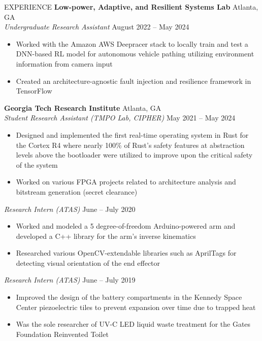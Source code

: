 \documentclass{resume} %
\begin{document}
\vspace{-0.8em}
\begin{rSection}{EXPERIENCE}
\textbf{Low-power, Adaptive, and Resilient Systems Lab} \hfill Atlanta, GA\\
\textit{Undergraduate Research Assistant} \hfill August 2022 -- May 2024
\vspace{-0.5em}
   \begin{itemize}
      \itemsep -5pt {} 
      \item Worked with the Amazon AWS Deepracer stack to locally train and test a DNN-based RL model
      for autonomous vehicle pathing utilizing environment information from camera input
      \item Created an architecture-agnostic fault injection and resilience framework in TensorFlow
   \end{itemize}
\vspace{-0.5em}
\textbf{Georgia Tech Research Institute} \hfill Atlanta, GA\\
\textit{Student Research Assistant (TMPO Lab, CIPHER)} \hfill May 2021 -- May 2024
\vspace{-0.5em}
 \begin{itemize}
    \itemsep -5pt {} 
     \item Designed and implemented the first real-time operating system in Rust for the Cortex R4 where
     nearly 100\% of Rust's safety features at abstraction levels above the bootloader were utilized to improve
     upon the critical safety of the system
     \item Worked on various FPGA projects related to architecture analysis and bitstream generation (secret clearance)
 \end{itemize}
\textit{Research Intern (ATAS)} \hfill June -- July 2020
\vspace{-0.5em}
 \begin{itemize}
    \itemsep -5pt {} 
     \item Worked and modeled a 5 degree-of-freedom Arduino-powered arm and
     developed a C++ library for the arm's inverse kinematics
     \item Researched various OpenCV-extendable libraries such as AprilTags for detecting visual orientation of the end effector
 \end{itemize}
\textit{Research Intern (ATAS)} \hfill June -- July 2019
\vspace{-0.5em}
 \begin{itemize}
    \itemsep -5pt {} 
     \item Improved the design of the battery compartments in the Kennedy Space Center piezoelectric tiles
     to prevent expansion over time due to trapped heat
     \item Was the sole researcher of UV-C LED liquid waste treatment for the Gates Foundation
     Reinvented Toilet
 \end{itemize}
\end{rSection} 
\end{document}
